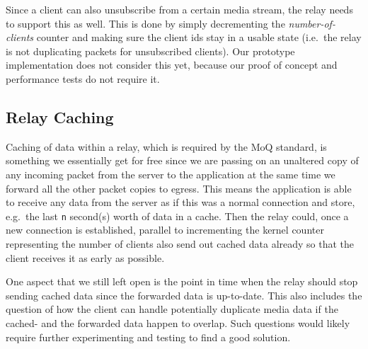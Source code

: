 Since a client can also unsubscribe from a certain media stream, the relay needs to support
this as well.
This is done by simply decrementing the \textit{number-of-clients} counter and making sure the 
client ids stay in a usable state (i.e.~the relay is not duplicating packets for unsubscribed 
clients).
Our prototype implementation does not consider this yet, because our proof of concept and 
performance tests do not require it.

\subsection{Relay Caching}
Caching of data within a relay, which is required by the MoQ standard, is something we essentially get
for free since we are passing on an unaltered copy of any incoming packet from the server to the 
application at the same time we forward all the other packet copies to egress.
This means the application is able to receive any data from the server as if this was a normal connection and 
store, e.g.~the last \verb|n| second(s) worth of data in a cache.
Then the relay could, once a new connection is established, parallel to incrementing the kernel counter 
representing the number of clients also send out cached data already so that the client receives it
as early as possible.

One aspect that we still left open is the point in time when the relay should stop 
sending cached data since the forwarded data is up-to-date.
This also includes the question of how the client can handle potentially duplicate media data if the 
cached- and the forwarded data happen to overlap.
Such questions would likely require further experimenting and testing to find a good solution.
